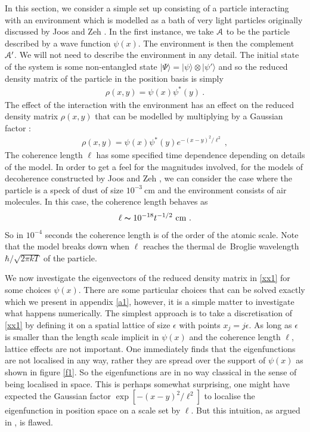 \documentclass[12pt]{article}
\def\BA{{\EuScript A}}
\def\ket#1{| #1\rangle}
\newcommand{\EQ}[1]{\begin{equation}\begin{split} #1
\end{split}\end{equation}}
\begin{document}
In this section, we consider a simple set up consisting of a particle interacting with an environment which is modelled as a bath of very light particles originally discussed by Joos and Zeh \cite{Joos:1984uk}. In the first instance, we take $\BA$ to be the particle described by a wave function $\psi(x)$. The environment is then the complement $\BA'$. We will not need to describe the environment in any detail. The initial state of the system is some
non-entangled state $\ket{\Psi}=\ket{\psi}\otimes\ket{\psi'}$ and so the reduced density matrix of the particle in the position basis is simply
\EQ{
\rho(x,y)=\psi(x)\psi^*(y)\ .
}
The effect of the interaction with the environment has an effect on the reduced density matrix $\rho(x,y)$ that can be modelled by multiplying by a Gaussian factor \cite{Joos:1984uk}:
\EQ{
\rho(x,y)=\psi(x)\psi^*(y)e^{-(x-y)^2/\ell^2}\ ,
\label{xx1}
}
The coherence length $\ell$ has some specified time dependence depending on details of the model. In order to get a feel for the magnitudes involved, for the models of decoherence constructed by Joos and Zeh \cite{Joos:1984uk}, we can consider the case where the particle is a speck of dust of size $10^{-3}\ \text{cm}$ and the environment consists of air molecules. In this case, the coherence length behaves as
\EQ{
\ell\thicksim 10^{-18}t^{-1/2}\ \text{cm}\ .
}
So in $10^{-4}$ seconds the coherence length is of the order of the atomic scale.
Note that the model breaks down when $\ell$ reaches the thermal de~Broglie wavelength $\hbar/\sqrt{2\pi kT}$ of the particle.


We now investigate the eigenvectors of the reduced density matrix in \eqref{xx1} for some choices $\psi(x)$. There are some particular choices that can be solved exactly which we present in appendix \ref{a1}, however, it is a simple matter to investigate what happens numerically. The simplest approach is to take a discretisation of \eqref{xx1} by defining it on a spatial lattice of size $\epsilon$ with points $x_j=j\epsilon$. As long as $\epsilon$ is smaller than the length scale implicit in $\psi(x)$ and the coherence length $\ell$, lattice effects are not important. One immediately finds that the eigenfunctions are not localised in any way, rather they are spread over the support of $\psi(x)$ as shown in figure \ref{f1}. So the eigenfunctions are in no way classical in the sense of being localised in space. This is perhaps somewhat surprising, one might have expected the Gaussian factor $\exp[-(x-y)^2/\ell^2]$ to localise the eigenfunction in position space on a scale set by $\ell$. But this intuition, as argued in \cite{B2,Donald1,Page:2011gi}, is flawed.
\end{document}
